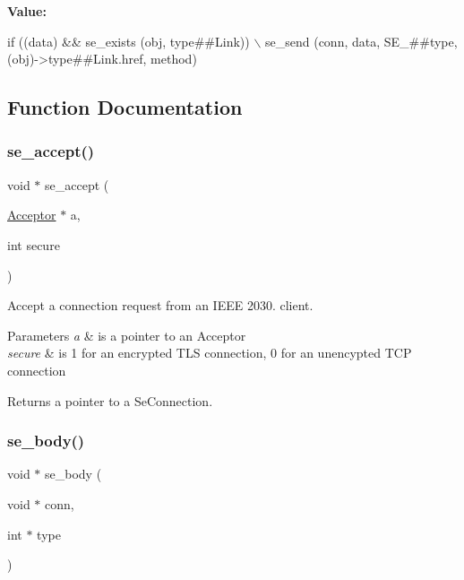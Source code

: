 {\bfseries Value\+:}
\begin{DoxyCode}
\textcolor{keywordflow}{if} ((data) && se\_exists (obj, type##Link))        \(\backslash\)
    se\_send (conn, data, SE\_##type, (obj)->type##Link.href, method)
\end{DoxyCode}


\subsection{Function Documentation}
\mbox{\label{group__se__connection_gafda63e89032e1e11058c4632e3f63bec}} 
\subsubsection{\texorpdfstring{se\+\_\+accept()}{se\_accept()}}
{\footnotesize\ttfamily void $\ast$ se\+\_\+accept (\begin{DoxyParamCaption}\item[{\hyperlink{group__tcp_ga99fb3ed761c86c0379dc50f80c51c87a}{Acceptor} $\ast$}]{a,  }\item[{int}]{secure }\end{DoxyParamCaption})}



Accept a connection request from an I\+E\+EE 2030. client. 


\begin{DoxyParams}{Parameters}
{\em a} & is a pointer to an Acceptor \\
\hline
{\em secure} & is 1 for an encrypted T\+LS connection, 0 for an unencypted T\+CP connection \\
\hline
\end{DoxyParams}
\begin{DoxyReturn}{Returns}
a pointer to a Se\+Connection. 
\end{DoxyReturn}
\mbox{\label{group__se__connection_gaa358895b986fa80d6ab485646b63f04e}} 
\subsubsection{\texorpdfstring{se\+\_\+body()}{se\_body()}}
{\footnotesize\ttfamily void $\ast$ se\+\_\+body (\begin{DoxyParamCaption}\item[{void $\ast$}]{conn,  }\item[{int $\ast$}]{type }\end{DoxyParamCaption})}



